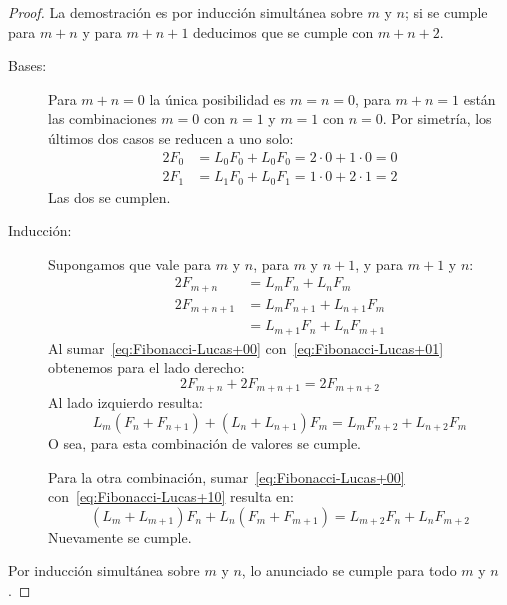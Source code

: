   \begin{proof}
    La demostración es por inducción simultánea sobre \(m\) y \(n\);
    si se cumple para \(m + n\)
    y para \(m + n + 1\) deducimos que se cumple con \(m + n + 2\).
    \begin{description}
    \item[Bases:]
      Para \(m + n = 0\) la única posibilidad es \(m = n = 0\),
      para \(m + n = 1\)
      están las combinaciones \(m = 0\) con \(n = 1\)
      y \(m = 1\) con \(n = 0\).
      Por simetría,
      los últimos dos casos se reducen a uno solo:
      \begin{align*}
	2 F_0
	  &= L_0 F_0 + L_0 F_0
	   = 2 \cdot 0 + 1 \cdot 0
	   = 0 \\
	2 F_1
	  &= L_1 F_0 + L_0 F_1
	   = 1 \cdot 0 + 2 \cdot 1
	   = 2
      \end{align*}
      Las dos se cumplen.
    \item[Inducción:]
      Supongamos que vale para \(m\) y \(n\),
      para \(m\) y \(n + 1\),
      y para \(m + 1\) y \(n\):
      \begin{align}
	2 F_{m + n}
	  &= L_m F_n + L_n F_m
	      \label{eq:Fibonacci-Lucas+00} \\
	2 F_{m + n + 1}
	  &= L_m F_{n + 1} + L_{n + 1} F_m
	      \label{eq:Fibonacci-Lucas+01} \\
	  &= L_{m + 1} F_n + L_n F_{m + 1}
	      \label{eq:Fibonacci-Lucas+10}
      \end{align}
      Al sumar~\eqref{eq:Fibonacci-Lucas+00}
      con~\eqref{eq:Fibonacci-Lucas+01} obtenemos
      para el lado derecho:
      \begin{equation*}
	2 F_{m + n} + 2 F_{m + n + 1}
	  = 2 F_{m + n + 2}
      \end{equation*}
      Al lado izquierdo resulta:
      \begin{equation*}
	L_m (F_n + F_{n + 1}) + (L_n + L_{n + 1}) F_m
	  = L_m F_{n + 2} + L_{n + 2} F_m
      \end{equation*}
      O sea,
      para esta combinación de valores se cumple.

      Para la otra combinación,
      sumar~\eqref{eq:Fibonacci-Lucas+00}
      con~\eqref{eq:Fibonacci-Lucas+10} resulta en:
      \begin{equation*}
	(L_m + L_{m + 1}) F_n + L_n (F_m + F_{m + 1})
	  = L_{m + 2} F_n + L_n F_{m + 2}
      \end{equation*}
      Nuevamente se cumple.
    \end{description}
    Por inducción simultánea sobre \(m\) y \(n\),
    lo anunciado se cumple para todo \(m\) y \(n\).
  \end{proof}

